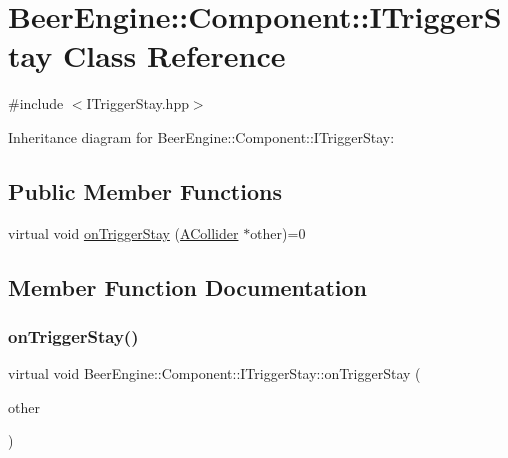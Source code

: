 \hypertarget{class_beer_engine_1_1_component_1_1_i_trigger_stay}{}\section{Beer\+Engine\+:\+:Component\+:\+:I\+Trigger\+Stay Class Reference}
\label{class_beer_engine_1_1_component_1_1_i_trigger_stay}


{\ttfamily \#include $<$I\+Trigger\+Stay.\+hpp$>$}



Inheritance diagram for Beer\+Engine\+:\+:Component\+:\+:I\+Trigger\+Stay\+:
\subsection*{Public Member Functions}
\begin{DoxyCompactItemize}
\item 
virtual void \mbox{\hyperlink{class_beer_engine_1_1_component_1_1_i_trigger_stay_ae0b762108ab5484071657e13f7a2cbd7}{on\+Trigger\+Stay}} (\mbox{\hyperlink{class_beer_engine_1_1_component_1_1_a_collider}{A\+Collider}} $\ast$other)=0
\end{DoxyCompactItemize}


\subsection{Member Function Documentation}
\mbox{\label{class_beer_engine_1_1_component_1_1_i_trigger_stay_ae0b762108ab5484071657e13f7a2cbd7}} 
\subsubsection{\texorpdfstring{on\+Trigger\+Stay()}{onTriggerStay()}}
{\footnotesize\ttfamily virtual void Beer\+Engine\+::\+Component\+::\+I\+Trigger\+Stay\+::on\+Trigger\+Stay (\begin{DoxyParamCaption}\item[{\mbox{\hyperlink{class_beer_engine_1_1_component_1_1_a_collider}{A\+Collider}} $\ast$}]{other }\end{DoxyParamCaption})\hspace{0.3cm}{\ttfamily [pure virtual]}}



